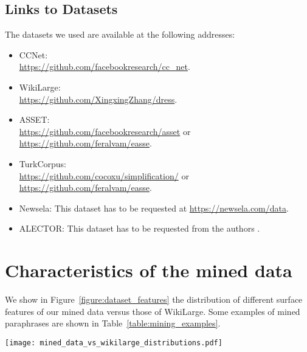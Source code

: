 \documentclass[11pt]{article}
\newcommand{\ccnet}{CCNet\xspace}
\newcommand{\wikilarge}{WikiLarge\xspace}
\newcommand{\asset}{ASSET\xspace}
\newcommand{\newsela}{Newsela\xspace}
\newcommand{\alector}{ALECTOR\xspace}
\newcommand{\turkcorpus}{TurkCorpus\xspace}
\begin{document}
\subsection{Links to Datasets}
The datasets we used are available at the following addresses:
\begin{itemize}
    \item \ccnet: \\\url{https://github.com/facebookresearch/cc_net}.
    \item \wikilarge: \\\url{https://github.com/XingxingZhang/dress}.
    \item \asset: \\\url{https://github.com/facebookresearch/asset} or \url{https://github.com/feralvam/easse}.
    \item \turkcorpus: \\\url{https://github.com/cocoxu/simplification/} or \url{https://github.com/feralvam/easse}.
    \item \newsela: This dataset has to be requested at \url{https://newsela.com/data}.
    \item \alector: This dataset has to be requested from the authors \cite{gala2020alector}.
\end{itemize}


\section{Characteristics of the mined data}
We show in Figure~\ref{figure:dataset_features} the distribution of different surface features of our mined data versus those of \wikilarge. Some examples of mined paraphrases are shown in Table~\ref{table:mining_examples}.

\begin{figure*}
    \centering
    \texttt{[image: mined\_data\_vs\_wikilarge\_distributions.pdf]}
    \caption{Density of several text features in \wikilarge and our mined data. The WordRank ratio is a measure of lexical complexity reduction \cite{martin2020controllable}. Replace-only Levenshtein similarity only considers replace operations in the traditional Levenshtein similarity and assigns 0 weights to insertions and deletions.}
    \label{figure:dataset_features}
\end{figure*}
\end{document}
